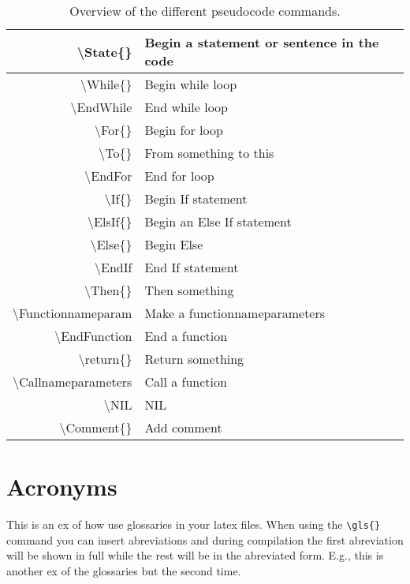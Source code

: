 \begin{table}[h]
    \begin{tabular}{r l}
        \textbackslash State\{\}              & Begin a statement or sentence in the code\\
        \hline

        \textbackslash While\{\}              & Begin while loop\\
        \textbackslash EndWhile               & End while loop\\
        \hline

        \textbackslash For\{\}                & Begin for loop\\
        \textbackslash To\{\}                 & From something to this\\
        \textbackslash EndFor                 & End for loop\\
        \hline

        \textbackslash If\{\}                 & Begin If statement\\
        \textbackslash ElsIf\{\}              & Begin an Else If statement\\
        \textbackslash Else\{\}               & Begin Else\\
        \textbackslash EndIf                  & End If statement\\
        \hline

        \textbackslash Then\{\}               & Then something\\
        \hline

        \textbackslash Function{name}{param}  & Make a function{name}{parameters}\\
        \textbackslash EndFunction            & End a function\\
        \textbackslash return\{\}             & Return something\\
        \textbackslash Call{name}{parameters} & Call a function\\

        \hline
        \textbackslash NIL                    & NIL\\
        \textbackslash Comment\{\}            & Add comment
    \end{tabular}
    \caption{Overview of the different pseudocode commands.}
    \label{table:pseudocode-commands}
\end{table}

\section{Acronyms}
This is an \gls{ex} of how use glossaries in your latex files. When using the
\texttt{\textbackslash gls\{\}} command you can insert abreviations and during compilation
the first abreviation will be shown in full while the rest will be in the
abreviated form. E.g., this is another \gls{ex} of the glossaries but the second
time.

